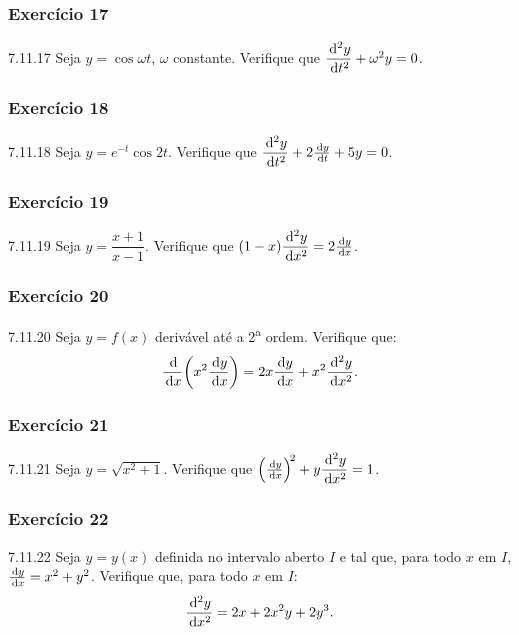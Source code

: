 \subsubsection*{Exercício 17}
\begin{exercicio}[17]{7.11.17}
Seja $y = \cos \omega t$, $\omega$ constante. Verifique que $\dfrac{\,\mathrm{d}^2 y}{\,\mathrm{d} t^2} + \omega^2 y = 0$.
\end{exercicio}

\subsubsection*{Exercício 18}
\begin{exercicio}[18]{7.11.18}
Seja $y = e^{-t}\cos 2t$. Verifique que $\dfrac{\,\mathrm{d}^2 y}{\,\mathrm{d} t^2} + 2\frac{\,\mathrm{d} y}{\,\mathrm{d} t} + 5y = 0$.
\end{exercicio}

\subsubsection*{Exercício 19}
\begin{exercicio}[19]{7.11.19}
Seja $y = \dfrac{x + 1}{x - 1}$. Verifique que $(1 - x)\dfrac{\,\mathrm{d}^2 y}{\,\mathrm{d} x^2} = 2\frac{\,\mathrm{d} y}{\,\mathrm{d} x}$.
\end{exercicio}

\subsubsection*{Exercício 20}
\begin{exercicio}[20]{7.11.20}
Seja $y = f(x)$ derivável até a 2\textsuperscript{a} ordem. Verifique que:
\[
\frac{\,\mathrm{d}}{\,\mathrm{d} x}\!\left(x^2 \frac{\,\mathrm{d} y}{\,\mathrm{d} x}\right) = 2x\frac{\,\mathrm{d} y}{\,\mathrm{d} x} + x^2 \frac{\,\mathrm{d}^2 y}{\,\mathrm{d} x^2}.
\]
\end{exercicio}

\subsubsection*{Exercício 21}
\begin{exercicio}[21]{7.11.21}
Seja $y = \sqrt{x^2 + 1}$. Verifique que $\left(\frac{\,\mathrm{d} y}{\,\mathrm{d} x}\right)^{\!2} + y\dfrac{\,\mathrm{d}^2 y}{\,\mathrm{d} x^2} = 1$.
\end{exercicio}

\subsubsection*{Exercício 22}
\begin{exercicio}[22]{7.11.22}
Seja $y = y(x)$ definida no intervalo aberto $I$ e tal que, para todo $x$ em $I$, $\frac{\,\mathrm{d} y}{\,\mathrm{d} x} = x^2 + y^2$. Verifique que, para todo $x$ em $I$:
\[
\frac{\,\mathrm{d}^2 y}{\,\mathrm{d} x^2} = 2x + 2x^2 y + 2y^3.
\]
\end{exercicio}

